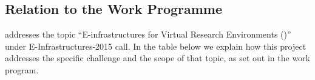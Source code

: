 \subsection{Relation to the Work Programme}

\enlargethispage{4cm}

\TheProject addresses the topic ``E-infrastructures for Virtual Research
Environments (\VREs)'' under E-Infrastructures-2015 call. In the table
below we explain how this project addresses the specific challenge and
the scope of that topic, as set out in the work program.
